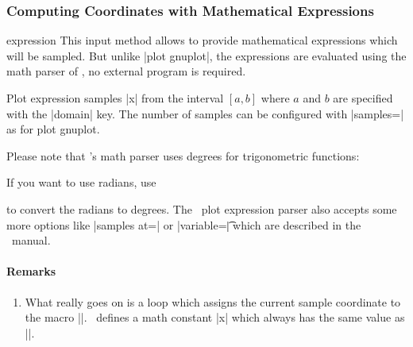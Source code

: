 \subsubsection{Computing Coordinates with Mathematical Expressions}

\begin{addplotoperation}[]{expression }{}
	This input method allows to provide mathematical expressions which will be sampled. But unlike |plot gnuplot|, the expressions are evaluated using the math parser of \PGF, no external program is required.

	Plot expression samples |x| from the interval $[a,b]$ where $a$ and $b$ are specified with the |domain| key. The number of samples can be configured with |samples=| as for plot gnuplot.

\begin{codeexample}[]
\end{codeexample}

Please note that \PGF's math parser uses degrees for trigonometric functions:
\begin{codeexample}[]
\end{codeexample}
\noindent If you want to use radians, use 
\begin{codeexample}[]
\end{codeexample}
\noindent to convert the radians to degrees. The \Tikz\ plot expression parser also accepts some more options like |samples at=| or |variable=\t| which are described in the \Tikz\ manual.

\paragraph{Remarks}
\begin{enumerate} 
	\item What really goes on is a loop which assigns the current sample coordinate to the macro |\x|. \PGFPlots\ defines a math constant |x| which always has the same value as |\x|.


\end{enumerate}
\end{addplotoperation}
